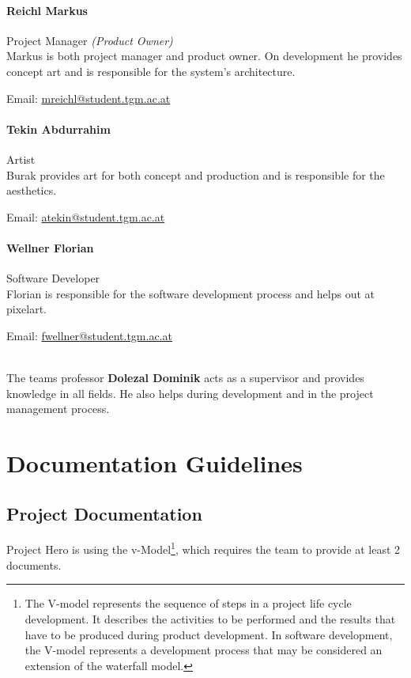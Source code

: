 \documentclass[11pt]{article}
\begin{document}
\paragraph{Reichl Markus} Project Manager \textit{\small{(Product Owner)}}\\
Markus is both project manager and product owner. On development he provides concept art and is responsible for the system's architecture.
\begin{description}
 \item Email: \href{mailto:mreichl@student.tgm.ac.at}{mreichl@student.tgm.ac.at}
\end{description}
\paragraph{Tekin Abdurrahim} Artist\\
Burak provides art for both concept and production and is responsible for the aesthetics.
\begin{description}
 \item Email: \href{mailto:atekin@student.tgm.ac.at}{atekin@student.tgm.ac.at}
\end{description}
\paragraph{Wellner Florian} Software Developer\\
Florian is responsible for the software development process and helps out at pixelart.
\begin{description}
 \item Email: \href{mailto:fwellner@student.tgm.ac.at}{fwellner@student.tgm.ac.at}
\end{description}
~\\
The teams professor \textbf{Dolezal Dominik} acts as a supervisor and provides knowledge in all fields.
He also helps during development and in the project management process.

\newpage

\section{Documentation Guidelines}
\subsection{Project Documentation}
Project Hero is using the v-Model\footnote{The V-model represents the sequence of steps in a project life cycle development. It describes the activities to be performed and the results that have to be produced during product development. In software development, the V-model represents a development process that may be considered an extension of the waterfall model.}, which requires the team to provide at least 2 documents.
\end{document}
